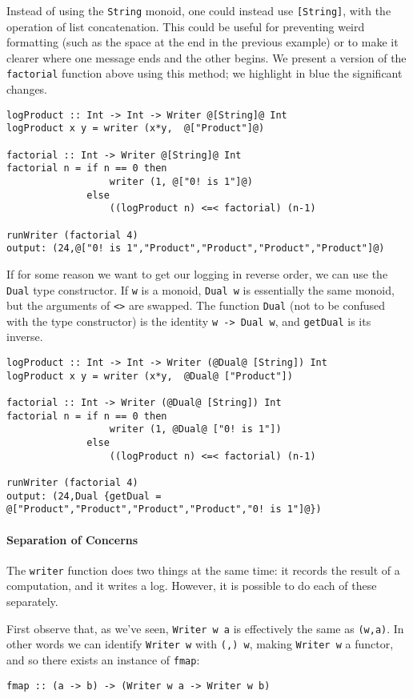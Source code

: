 \documentclass[11pt]{article}
\theoremstyle{nonumberplain}
\newcommand*\lsin{\lstinline}
\begin{document}
Instead of using the \lsin|String| monoid, one could instead use \mbox{\lsin|[String]|}, with the operation of list concatenation. This could be useful for preventing weird formatting (such as the space at the end in the previous example) or to make it clearer where one message ends and the other begins. We present a version of the \lsin|factorial| function above using this method; we highlight in {\color{blue} blue} the significant changes.
\begin{lstlisting}
logProduct :: Int -> Int -> Writer @[String]@ Int
logProduct x y = writer (x*y,  @["Product"]@)

factorial :: Int -> Writer @[String]@ Int
factorial n = if n == 0 then
                  writer (1, @["0! is 1"]@) 
              else
                  ((logProduct n) <=< factorial) (n-1)

runWriter (factorial 4)
output: (24,@["0! is 1","Product","Product","Product","Product"]@)
\end{lstlisting}

If for some reason we want to get our logging in reverse order, we can use the \lsin|Dual| type constructor. If \lsin|w| is a monoid, \lsin|Dual w| is essentially the same monoid, but the arguments of \lsin|<>| are swapped. The function \lsin|Dual| (not to be confused with the type constructor) is the identity \lsin|w -> Dual w|, and \lsin|getDual| is its inverse.
\begin{lstlisting}
logProduct :: Int -> Int -> Writer (@Dual@ [String]) Int
logProduct x y = writer (x*y,  @Dual@ ["Product"])

factorial :: Int -> Writer (@Dual@ [String]) Int
factorial n = if n == 0 then
                  writer (1, @Dual@ ["0! is 1"]) 
              else
                  ((logProduct n) <=< factorial) (n-1)

runWriter (factorial 4)
output: (24,Dual {getDual = @["Product","Product","Product","Product","0! is 1"]@})
\end{lstlisting}

\paragraph{Separation of Concerns}
The \lsin|writer| function does two things at the same time: it records the result of a computation, and it writes a log. However, it is possible to do each of these separately.

First observe that, as we've seen, \lsin|Writer w a| is effectively the same as \lsin|(w,a)|. In other words we can identify \lsin|Writer w| with \lsin|(,) w|, making \lsin|Writer w| a functor, and so there exists an instance of \lsin|fmap|:
\begin{lstlisting}
fmap :: (a -> b) -> (Writer w a -> Writer w b)
\end{lstlisting}
\end{document}
